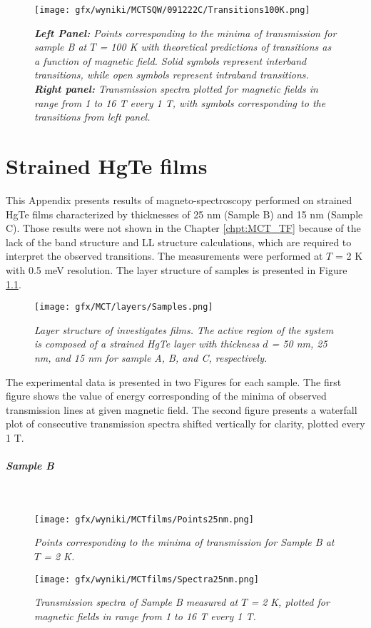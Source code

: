\documentclass[titlepage,a4paper]{book}
\newcommand{\wciecie}{\quad\phantom{v}}
\newcommand{\myparagraph}[1]{\paragraph{#1}\mbox{}\\}
\begin{document}
\begin{figure}[H]
	\centering
	\texttt{[image: gfx/wyniki/MCTSQW/091222C/Transitions100K.png]}
	\vspace{-10pt}
	\caption{\textit{\textbf{Left Panel:} Points corresponding to the minima of transmission for sample B at $T$ = 100 K with theoretical predictions of transitions as a function of magnetic field. Solid symbols represent interband transitions, while open symbols represent intraband transitions. \textbf{Right panel:} Transmission spectra plotted for magnetic fields in range from 1 to 16 T every 1 T, with symbols corresponding to the transitions from left panel.}}
	\label{fig:Summary_SQW_100K}
\end{figure}


\chapter{Strained HgTe films}
\label{Appendix_films}
\wciecie
This Appendix presents results of magneto-spectroscopy performed on strained HgTe films characterized by thicknesses of 25 nm (Sample B) and 15 nm (Sample C). Those results were not shown in the Chapter \ref{chpt:MCT_TF} because of the lack of the band structure and LL structure calculations, which are required to interpret the observed transitions. The measurements were performed at $T$ = 2 K with 0.5 meV resolution. The layer structure of samples is presented in Figure \ref{fig:Samples_layers2}.

\begin{figure}[ht]
	\centering
	\texttt{[image: gfx/MCT/layers/Samples.png]}
	\vspace{-10pt}
	\caption{\textit{Layer structure of investigates films. The active region of the system is composed of a strained HgTe layer with thickness $d$ = 50 nm, 25 nm, and 15 nm for sample A, B, and C, respectively.}}
	\label{fig:Samples_layers2}
\end{figure} 

The experimental data is presented in two Figures for each sample. The first figure shows the value of energy corresponding of the minima of observed transmission lines at given magnetic field. The second figure presents a waterfall plot of consecutive transmission spectra shifted vertically for clarity, plotted every 1 T.

\clearpage
\myparagraph{Sample B}
\begin{figure}[H]
	\centering
	\texttt{[image: gfx/wyniki/MCTfilms/Points25nm.png]}
	\vspace{-10pt}
	\caption{\textit{Points corresponding to the minima of transmission for Sample B at $T$ = 2 K.}}
	\label{fig:Points25nm}
\end{figure}
\begin{figure}[H]
	\centering
	\texttt{[image: gfx/wyniki/MCTfilms/Spectra25nm.png]}
	\vspace{-10pt}
	\caption{\textit{Transmission spectra of Sample B measured at $T$ = 2 K, plotted for magnetic fields in range from 1 to 16 T every 1 T.}}
	\label{fig:Spectra25nm}
\end{figure}
\end{document}
